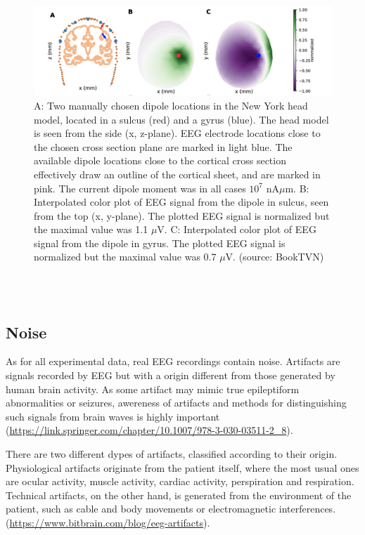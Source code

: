 \documentclass[a4paper, UKenglish, 11pt]{uiomaster}
\begin{document}
\begin{figure}[!htb]
    \centering
    \includegraphics[width=\linewidth]{figures/gyrus_and_sulcus_EEG.png}
    \caption{A: Two manually chosen dipole locations in the New York head model, located in a sulcus (red) and a gyrus (blue). The head model is seen from the side (x, z-plane). EEG electrode locations close to the chosen cross section plane are marked in light blue. The available dipole locations close to the cortical cross section effectively draw an outline of the cortical sheet, and are marked in pink. The current dipole moment was in all cases $10^7$ nA$\mu$m. B: Interpolated color plot of EEG signal from the dipole in sulcus, seen from the top (x, y-plane). The plotted EEG signal is normalized but the maximal value was 1.1 $\mu$V. C: Interpolated color plot of EEG signal from the dipole in gyrus. The plotted EEG signal is normalized but the maximal value was 0.7 $\mu$V. (source: BookTVN)}
    \label{fig:gyrus_and_sulcus_EEG}
\end{figure}
\\
\\

\subsection{Noise}
As for all experimental data, real EEG recordings contain noise. Artifacts are signals recorded by EEG but with a
origin different from those generated by human brain activity. As some artifact may mimic true epileptiform abnormalities or seizures, awereness of artifacts and methods for distinguishing such signals from brain waves is highly important (\url{https://link.springer.com/chapter/10.1007/978-3-030-03511-2_8}).

There are two different dypes of artifacts, classified according to their origin. Physiological artifacts originate from the patient itself, where the most usual ones are ocular activity, muscle activity, cardiac activity, perspiration and respiration. Technical artifacts, on the other hand, is generated from the environment of the patient, such as cable and body movements or electromagnetic interferences. (\url{https://www.bitbrain.com/blog/eeg-artifacts}).
\end{document}
